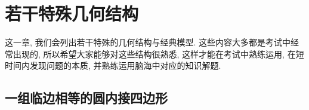 \documentclass{book}
\begin{document}
\chapter{若干特殊几何结构}
\thispagestyle{empty}
\setcounter{figure}{-1}


这一章, 我们会列出若干特殊的几何结构与经典模型. 这些内容大多都是考试中经常出现的, 所以希望大家能够对这些结构很熟悉, 这样才能在考试中熟练运用, 在短时间内发现问题的本质, 并熟练运用脑海中对应的知识解题. \par


\section{一组临边相等的圆内接四边形}

\begin{paracol}{2}


\end{paracol}
\end{document}
